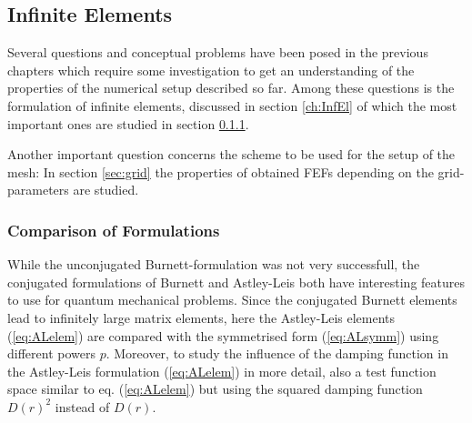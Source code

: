 \subsection{Infinite Elements}
Several questions and conceptual problems have been posed in the previous chapters which require some investigation to get an understanding of the properties of the numerical setup described so far.
Among these questions is the formulation of infinite elements, discussed in section \ref{ch:InfEl} of which the most important ones are studied in section \ref{ch:bmFormul}.

Another important question concerns the scheme to be used for the setup of the mesh: In section \ref{sec:grid} the properties of obtained FEFs depending on the grid-parameters are studied.

\subsubsection{Comparison of Formulations}
\label{ch:bmFormul}
While the unconjugated Burnett-formulation was not very successfull, the conjugated formulations of Burnett and Astley-Leis both have interesting features to use for quantum mechanical problems.
Since the conjugated Burnett elements lead to infinitely large matrix elements, here the Astley-Leis elements (\ref{eq:ALelem}) are compared with the symmetrised form (\ref{eq:ALsymm}) using different powers $p$.
Moreover, to study the influence of the damping function in the Astley-Leis formulation (\ref{eq:ALelem}) in more detail, also a test function space similar to eq. (\ref{eq:ALelem}) but using the squared damping function $D(r)^2$ instead of $D(r)$.

